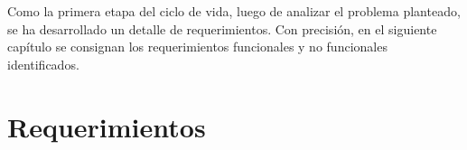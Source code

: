 Como la primera etapa del ciclo de vida, luego de analizar el problema planteado, se ha desarrollado un detalle de requerimientos. Con precisión, en el siguiente capítulo se consignan los requerimientos funcionales y no funcionales identificados.

\section{Requerimientos}
